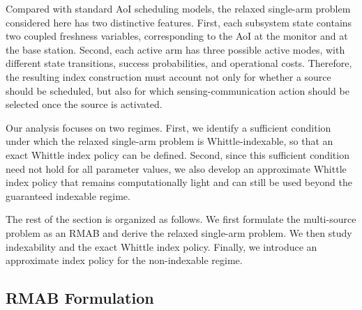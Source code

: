 \documentclass[letterpaper,journal]{IEEEtran}
\begin{document}
Compared with standard AoI scheduling models, the relaxed single-arm problem considered here has two distinctive features. First, each subsystem state contains two coupled freshness variables, corresponding to the AoI at the monitor and at the base station. Second, each active arm has three possible active modes, with different state transitions, success probabilities, and operational costs. Therefore, the resulting index construction must account not only for whether a source should be scheduled, but also for which sensing-communication action should be selected once the source is activated.

Our analysis focuses on two regimes. First, we identify a sufficient condition under which the relaxed single-arm problem is Whittle-indexable, so that an exact Whittle index policy can be defined. Second, since this sufficient condition need not hold for all parameter values, we also develop an approximate Whittle index policy that remains computationally light and can still be used beyond the guaranteed indexable regime.

The rest of the section is organized as follows. We first formulate the multi-source problem as an RMAB and derive the relaxed single-arm problem. We then study indexability and the exact Whittle index policy. Finally, we introduce an approximate index policy for the non-indexable regime.
	

\subsection{RMAB Formulation}
	
\end{document}
